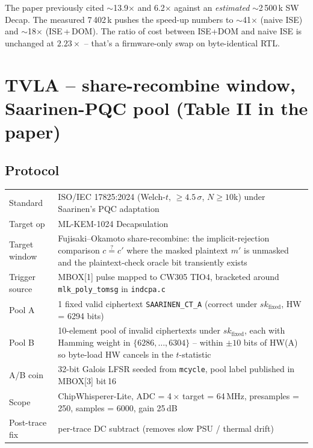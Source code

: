 \documentclass[11pt]{article}
\newcommand{\mlkem}{ML-KEM-1024}
\begin{document}
The paper previously cited \(\sim\)13.9$\times$ and 6.2$\times$ against an
\emph{estimated} \(\sim\)2\,500\,k SW Decap. The measured 7\,402\,k pushes the
speed-up numbers to \(\sim\)41$\times$ (naive ISE) and \(\sim\)18$\times$
(ISE\,+\,DOM). The ratio of cost between ISE+DOM and naive ISE is unchanged at
$2.23\times$ -- that's a firmware-only swap on byte-identical RTL.

\section{TVLA -- share-recombine window, Saarinen-PQC pool (Table II in the paper)}

\subsection{Protocol}

\begin{tabularx}{\linewidth}{@{}lX@{}}
\toprule
Standard        & ISO/IEC 17825:2024 (Welch-$t$, $\geq{}4.5\,\sigma$, $N{\geq}10$k) under Saarinen's PQC adaptation~\cite{saarinen} \\
Target op       & \mlkem{} Decapsulation \\
Target window   & Fujisaki--Okamoto share-recombine: the implicit-rejection comparison $c \stackrel{?}{=} c'$ where the masked plaintext $m'$ is unmasked and the plaintext-check oracle bit transiently exists \\
Trigger source  & MBOX[1] pulse mapped to CW305 TIO4, bracketed around \texttt{mlk\_poly\_tomsg} in \texttt{indcpa.c} \\
Pool A          & 1 fixed valid ciphertext \texttt{SAARINEN\_CT\_A} (correct under $\mathit{sk}_{\textrm{fixed}}$, HW = 6294 bits) \\
Pool B          & 10-element pool of invalid ciphertexts under $\mathit{sk}_{\textrm{fixed}}$, each with Hamming weight in $\{6286,\dots,6304\}$ -- within $\pm10$ bits of HW(A) so byte-load HW cancels in the $t$-statistic \\
A/B coin        & 32-bit Galois LFSR seeded from \texttt{mcycle}, pool label published in MBOX[3] bit\,16 \\
Scope           & ChipWhisperer-Lite, ADC = 4\,$\times$ target = 64\,MHz, presamples = 250, samples = 6000, gain 25\,dB \\
Post-trace fix  & per-trace DC subtract (removes slow PSU / thermal drift) \\
\bottomrule
\end{tabularx}
\end{document}
